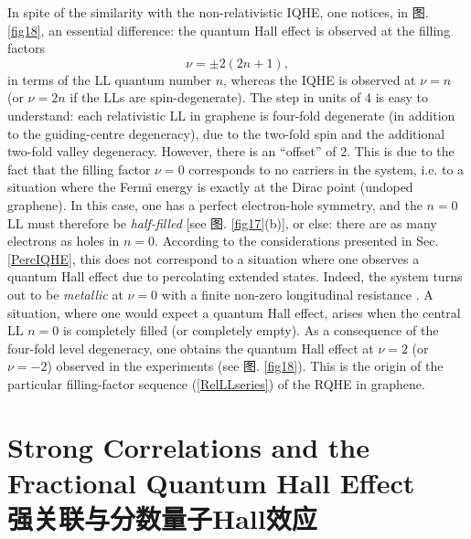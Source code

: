 \documentclass[10pt]{book}
\newcommand{\beq}{\begin{equation}}
\newcommand{\eeq}{\end{equation}}
\begin{document}
In spite of the similarity with the non-relativistic IQHE, one notices, in 图. \ref{fig18}, an essential difference: the quantum
Hall effect is observed at the filling factors 
\beq\label{RelLLseries}
\nu=\pm 2(2n+1),
\eeq
in terms of the LL quantum number $n$, whereas the IQHE
is observed at $\nu=n$ (or $\nu=2n$ if the LLs are spin-degenerate). The step in units of 4 is easy to understand: each
relativistic LL in graphene is four-fold degenerate (in addition to the guiding-centre degeneracy), due to the two-fold spin and
the additional two-fold valley degeneracy. However, there is an ``offset'' of 2. This is due to the fact that the filling 
factor $\nu=0$ corresponds to no carriers in the system, i.e. to a situation where the Fermi energy is exactly at the Dirac
point (undoped graphene). In this case, one has a perfect electron-hole symmetry, and the $n=0$ LL must therefore be {\sl half-filled}
[see 图. \ref{fig17}(b)], or else: there are as many electrons as holes in $n=0$. According to the considerations presented
in Sec. \ref{PercIQHE}, this does not correspond to a situation where one observes a quantum Hall effect due to percolating extended
states. Indeed, the system turns out to be {\sl metallic} at $\nu=0$ with a finite non-zero longitudinal resistance 
\cite{graph1,graph2}. 
A situation, where one would expect a quantum Hall effect, arises when the central LL $n=0$ is completely filled (or completely empty).
As a consequence of the four-fold level degeneracy, one obtains the quantum Hall effect at $\nu=2$ (or $\nu=-2$) observed in
the experiments (see 图. \ref{fig18}). This is the origin of the
particular filling-factor sequence (\ref{RelLLseries}) of the RQHE in graphene.






\chapter[强关联与分数量子Hall效应]{Strong Correlations and the Fractional Quantum Hall Effect\\\bf 强关联与分数量子Hall效应}
\label{FQHE}

\end{document}
